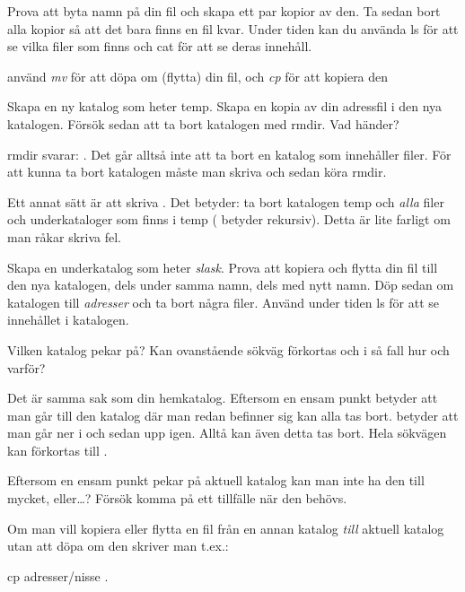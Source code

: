 \documentclass[a4paper,twocolumn]{book}
\begin{document}
\begin{exercise}
  Prova att byta namn på din fil och skapa ett par kopior av den. Ta
  sedan bort alla kopior så att det bara finns en fil kvar. Under
  tiden kan du använda ls för att se vilka filer som finns och cat för
  att se deras innehåll.
  \begin{answer}
    använd \emph{mv} för att döpa om (flytta) din fil, och \emph{cp} för att kopiera den
  \end{answer}
\end{exercise}

\begin{exercise}
  Skapa en ny katalog som heter temp. Skapa en kopia av din adressfil
  i den nya katalogen. Försök sedan att ta bort katalogen med
  rmdir. Vad händer?
  \begin{answer}
    rmdir svarar: . Det går
    alltså inte att ta bort en katalog som innehåller filer. För att
    kunna ta bort katalogen måste man skriva  och
    sedan köra rmdir.

    Ett annat sätt är att skriva . Det betyder: ta
    bort katalogen temp och \emph{alla} filer och underkataloger som
    finns i temp ( betyder rekursiv). Detta är lite
    farligt om man råkar skriva fel.
  \end{answer}
\end{exercise}
\begin{exercise}
  Skapa en underkatalog som heter \emph{slask}. Prova att kopiera och
  flytta din fil till den nya katalogen, dels under samma namn, dels
  med nytt namn. Döp sedan om katalogen till \emph{adresser} och ta
  bort några filer.  Använd under tiden ls för att se innehållet i
  katalogen.
\end{exercise}

\begin{exercise}
  Vilken katalog pekar  på? Kan
  ovanstående sökväg förkortas och i så fall hur och varför?
  \begin{answer}
    Det är samma sak som din hemkatalog. Eftersom en ensam punkt
    betyder att man går till den katalog där man redan befinner sig
    kan alla  tas bort.  betyder att
    man går ner i  och sedan upp igen. Alltå kan även
    detta tas bort. Hela sökvägen kan förkortas till \ST{\~{}}.
  \end{answer}
\end{exercise}
\begin{exercise}
  Eftersom en ensam punkt pekar på aktuell katalog kan man inte ha den
  till mycket, eller\ldots? Försök komma på ett tillfälle när den behövs.
  \begin{answer}
    Om man vill kopiera eller flytta en fil från en annan katalog
    \emph{till} aktuell katalog utan att döpa om den skriver man t.ex.:
    \begin{ttquote}
      cp adresser/nisse .
    \end{ttquote}
  \end{answer}
\end{exercise}
\end{document}
